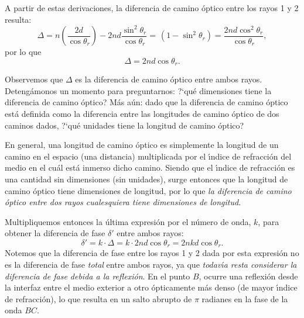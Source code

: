 \documentclass[a4paper]{article}
\begin{document}
A partir de estas derivaciones, la diferencia de camino \'optico entre los
rayos 1 y 2 resulta:
\begin{equation*}
    \Delta = n \left( \frac{2d}{\cos \theta_r} \right) - 2 n d 
    \frac{\sin^2 \theta_r}{\cos \theta_r} = \frac{}{} \left( 1 - \sin^2 
    \theta_r \right) = \frac{2nd \cos^2 \theta_r}{\cos \theta_r},
\end{equation*}
por lo que
\begin{equation}
\Delta = 2 n d \cos \theta_r. 
\end{equation}

Observemos que $\Delta$ es la diferencia de camino \'optico entre ambos rayos.
Deteng\'amonos un momento para preguntarnos: ?`qu\'e dimensiones tiene la
diferencia de camino \'optico? M\'as a\'un: dado que la diferencia de camino
\'optico est\'a definida como la diferencia entre las longitudes de camino
\'optico de dos caminos dados, ?`qu\'e unidades tiene la longitud de camino
\'optico?

En general, una longitud de camino \'optico es simplemente la longitud de un
camino en el espacio (una distancia) multiplicada por el 
\'\i ndice de refracci\'on del medio en el cu\'al est\'a inmerso dicho camino.
Siendo que el \'\i ndice de refracci\'on es una cantidad sin dimensiones 
(sin unidades), surge entonces que la longitud de camino \'optico tiene 
dimensiones de longitud, por lo que {\it la diferencia de camino \'optico 
entre dos rayos cualesquiera tiene dimensiones de longitud}. 

Multipliquemos entonces la \'ultima expresi\'on por el n\'umero de onda, $k$,
para obtener la diferencia de fase $\delta'$ entre ambos rayos:
\begin{equation}
    \delta' = k \cdot \Delta = k \cdot 2 n d \cos \theta_r = 2 n k d  
    \cos \theta_r.
\end{equation}
Notemos que la diferencia de fase entre los rayos 1 y 2 dada por
esta expresi\'on no es la diferencia de fase {\it total} entre ambos rayos, 
ya que {\it todav\'\i a resta considerar la diferencia de fase debida a la 
reflexi\'on}. En el punto $B$, ocurre una reflexi\'on desde la interfaz entre
el medio exterior a otro \'opticamente m\'as denso (de mayor \'\i ndice de 
refracci\'on), lo que resulta en un salto abrupto de $\pi$ radianes en la 
fase de la onda $BC$. 
\end{document}
